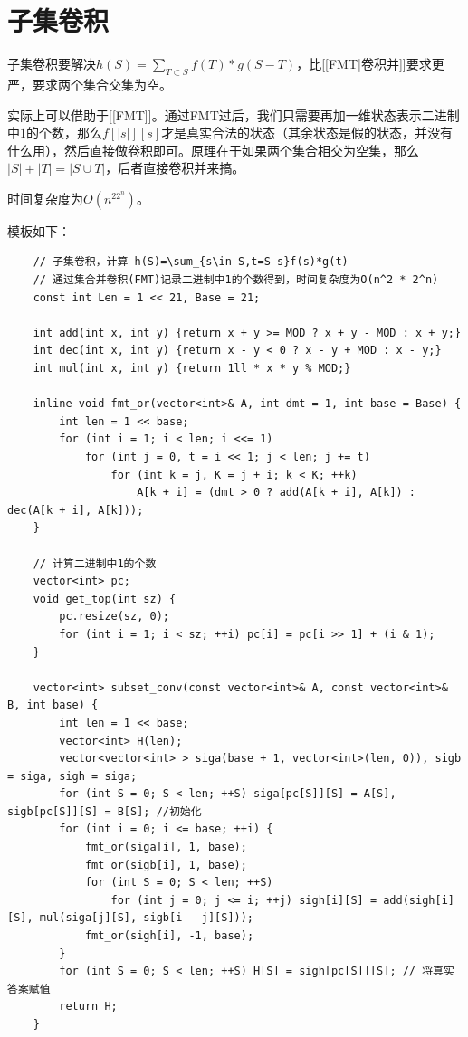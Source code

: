 \documentclass[a4paper,11pt,twoside,fontset = fandol,UTF8]{ctexbook} %
\begin{document}
	\section{子集卷积}
	子集卷积要解决$\displaystyle h(S)=\sum_{T\subset S}f(T)*g(S-T)$，比[[FMT|卷积并]]要求更严，要求两个集合交集为空。
	
	实际上可以借助于[[FMT]]。通过FMT过后，我们只需要再加一维状态表示二进制中$1$的个数，那么$f[|s|][s]$才是真实合法的状态（其余状态是假的状态，并没有什么用），然后直接做卷积即可。原理在于如果两个集合相交为空集，那么$|S|+|T|=|S\cup T|$，后者直接卷积并来搞。
	
	时间复杂度为$O(n^22^n)$。
	
	模板如下：
	
	\begin{lstlisting}
	// 子集卷积，计算 h(S)=\sum_{s\in S,t=S-s}f(s)*g(t)
	// 通过集合并卷积(FMT)记录二进制中1的个数得到，时间复杂度为O(n^2 * 2^n)
	const int Len = 1 << 21, Base = 21;
	
	int add(int x, int y) {return x + y >= MOD ? x + y - MOD : x + y;}
	int dec(int x, int y) {return x - y < 0 ? x - y + MOD : x - y;}
	int mul(int x, int y) {return 1ll * x * y % MOD;}
	
	inline void fmt_or(vector<int>& A, int dmt = 1, int base = Base) {
	    int len = 1 << base;
	    for (int i = 1; i < len; i <<= 1)
	        for (int j = 0, t = i << 1; j < len; j += t)
	            for (int k = j, K = j + i; k < K; ++k) 
	                A[k + i] = (dmt > 0 ? add(A[k + i], A[k]) : dec(A[k + i], A[k]));
	}
	
	// 计算二进制中1的个数
	vector<int> pc;
	void get_top(int sz) {
	    pc.resize(sz, 0);
	    for (int i = 1; i < sz; ++i) pc[i] = pc[i >> 1] + (i & 1);
	}
	
	vector<int> subset_conv(const vector<int>& A, const vector<int>& B, int base) {
	    int len = 1 << base;
	    vector<int> H(len);
	    vector<vector<int> > siga(base + 1, vector<int>(len, 0)), sigb = siga, sigh = siga;
	    for (int S = 0; S < len; ++S) siga[pc[S]][S] = A[S], sigb[pc[S]][S] = B[S]; //初始化
	    for (int i = 0; i <= base; ++i) {
	        fmt_or(siga[i], 1, base);
	        fmt_or(sigb[i], 1, base);
	        for (int S = 0; S < len; ++S)
	            for (int j = 0; j <= i; ++j) sigh[i][S] = add(sigh[i][S], mul(siga[j][S], sigb[i - j][S]));
	        fmt_or(sigh[i], -1, base);
	    }
	    for (int S = 0; S < len; ++S) H[S] = sigh[pc[S]][S]; // 将真实答案赋值
	    return H;
	}
	\end{lstlisting}
	
\end{document}
